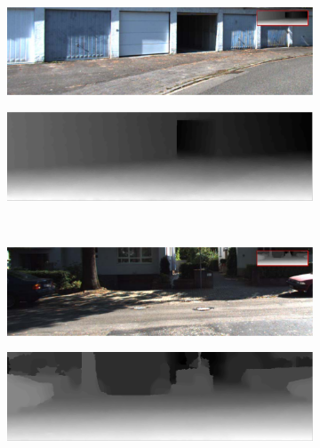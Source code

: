 \documentclass[preprint,10pt,5p,times,twocolumn]{elsarticle}
\begin{document}
\begin{figure}[t]
\centering
\begin{subfigure}[b]{0.49\textwidth}
\includegraphics[width=\textwidth]{exp3_ref_gray.pdf}
\end{subfigure}
\begin{subfigure}[b]{0.49\textwidth}
\includegraphics[width=\textwidth]{exp3_upsampling_smooth_gray.pdf}
\end{subfigure}
\\
\begin{subfigure}[b]{0.49\textwidth}
\includegraphics[width=\textwidth]{exp1_ref_gray.pdf}
\end{subfigure}
\begin{subfigure}[b]{0.49\textwidth}
\includegraphics[width=\textwidth]{exp1_upsampling_smooth.png}
\end{subfigure}
\\
\begin{subfigure}[b]{0.49\textwidth}

\end{subfigure}
\end{figure}
\end{document}

